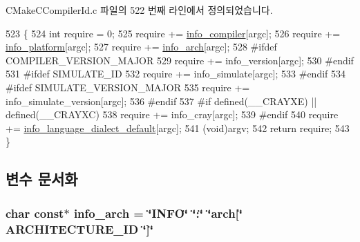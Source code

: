 C\+Make\+C\+Compiler\+Id.\+c 파일의 522 번째 라인에서 정의되었습니다.


\begin{DoxyCode}
523 \{
524   \textcolor{keywordtype}{int} require = 0;
525   require += \hyperlink{avdecc-lib_2_c_make_files_23_85_81_2_compiler_id_c_2_c_make_c_compiler_id_8c_a4b0efeb7a5d59313986b3a0390f050f6}{info\_compiler}[argc];
526   require += \hyperlink{avdecc-lib_2_c_make_files_23_85_81_2_compiler_id_c_2_c_make_c_compiler_id_8c_a2321403dee54ee23f0c2fa849c60f7d4}{info\_platform}[argc];
527   require += \hyperlink{avdecc-lib_2_c_make_files_23_85_81_2_compiler_id_c_2_c_make_c_compiler_id_8c_a59647e99d304ed33b15cb284c27ed391}{info\_arch}[argc];
528 \textcolor{preprocessor}{#ifdef COMPILER\_VERSION\_MAJOR}
529   require += info\_version[argc];
530 \textcolor{preprocessor}{#endif}
531 \textcolor{preprocessor}{#ifdef SIMULATE\_ID}
532   require += info\_simulate[argc];
533 \textcolor{preprocessor}{#endif}
534 \textcolor{preprocessor}{#ifdef SIMULATE\_VERSION\_MAJOR}
535   require += info\_simulate\_version[argc];
536 \textcolor{preprocessor}{#endif}
537 \textcolor{preprocessor}{#if defined(\_\_CRAYXE) || defined(\_\_CRAYXC)}
538   require += info\_cray[argc];
539 \textcolor{preprocessor}{#endif}
540   require += \hyperlink{avdecc-lib_2_c_make_files_23_85_81_2_compiler_id_c_2_c_make_c_compiler_id_8c_a1ce162bad2fe6966ac8b33cc19e120b8}{info\_language\_dialect\_default}[argc];
541   (void)argv;
542   \textcolor{keywordflow}{return} require;
543 \}
\end{DoxyCode}


\subsection{변수 문서화}
\subsubsection[{\texorpdfstring{info\+\_\+arch}{info_arch}}]{\setlength{\rightskip}{0pt plus 5cm}char const$\ast$ info\+\_\+arch = \char`\"{}I\+N\+FO\char`\"{} \char`\"{}\+:\char`\"{} \char`\"{}arch\mbox{[}\char`\"{} A\+R\+C\+H\+I\+T\+E\+C\+T\+U\+R\+E\+\_\+\+ID \char`\"{}\mbox{]}\char`\"{}}\hypertarget{avdecc-lib_2_c_make_files_23_85_81_2_compiler_id_c_2_c_make_c_compiler_id_8c_a59647e99d304ed33b15cb284c27ed391}{}\label{avdecc-lib_2_c_make_files_23_85_81_2_compiler_id_c_2_c_make_c_compiler_id_8c_a59647e99d304ed33b15cb284c27ed391}


